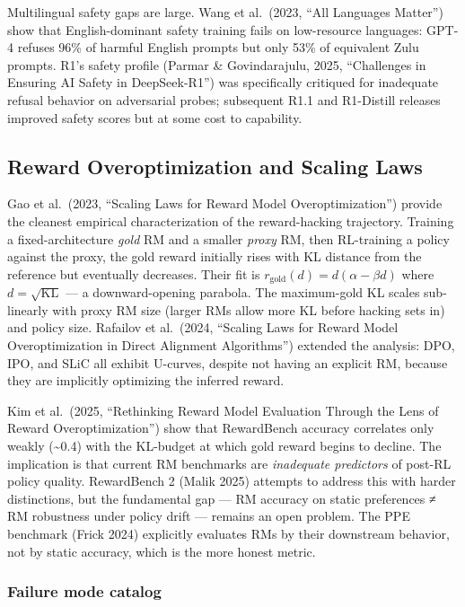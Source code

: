 Multilingual safety gaps are large. Wang et al.~(2023, ``All Languages Matter'') show that English-dominant safety training fails on low-resource languages: GPT-4 refuses 96\% of harmful English prompts but only 53\% of equivalent Zulu prompts. R1's safety profile (Parmar \& Govindarajulu, 2025, ``Challenges in Ensuring AI Safety in DeepSeek-R1'') was specifically critiqued for inadequate refusal behavior on adversarial probes; subsequent R1.1 and R1-Distill releases improved safety scores but at some cost to capability.

\subsection{Reward Overoptimization and Scaling Laws}\label{reward-overoptimization-and-scaling-laws}

Gao et al.~(2023, ``Scaling Laws for Reward Model Overoptimization'') provide the cleanest empirical characterization of the reward-hacking trajectory. Training a fixed-architecture \emph{gold} RM and a smaller \emph{proxy} RM, then RL-training a policy against the proxy, the gold reward initially rises with KL distance from the reference but eventually decreases. Their fit is \(r_{\text{gold}}(d) = d(\alpha - \beta d)\) where \(d = \sqrt{\mathrm{KL}}\) --- a downward-opening parabola. The maximum-gold KL scales sub-linearly with proxy RM size (larger RMs allow more KL before hacking sets in) and policy size. Rafailov et al.~(2024, ``Scaling Laws for Reward Model Overoptimization in Direct Alignment Algorithms'') extended the analysis: DPO, IPO, and SLiC all exhibit U-curves, despite not having an explicit RM, because they are implicitly optimizing the inferred reward.

Kim et al.~(2025, ``Rethinking Reward Model Evaluation Through the Lens of Reward Overoptimization'') show that RewardBench accuracy correlates only weakly (\textasciitilde0.4) with the KL-budget at which gold reward begins to decline. The implication is that current RM benchmarks are \emph{inadequate predictors} of post-RL policy quality. RewardBench 2 (Malik 2025) attempts to address this with harder distinctions, but the fundamental gap --- RM accuracy on static preferences ≠ RM robustness under policy drift --- remains an open problem. The PPE benchmark (Frick 2024) explicitly evaluates RMs by their downstream behavior, not by static accuracy, which is the more honest metric.

\subsubsection{Failure mode catalog}\label{failure-mode-catalog}

